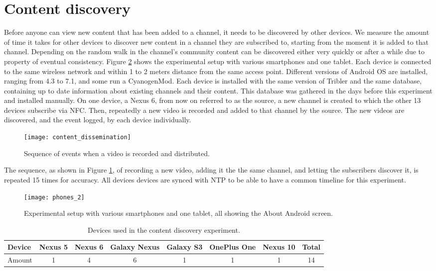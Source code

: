 \section{Content discovery}\label{sec:content_discovery}
Before anyone can view new content that has been added to a channel, it needs to be discovered by other devices.
We measure the amount of time it takes for other devices to discover new content in a channel they are subscribed to, starting from the moment it is added to that channel.
Depending on the random walk in the channel's community content can be discovered either very quickly or after a while due to property of eventual consistency.
Figure \ref{fig:phones_2} shows the experimental setup with various smartphones and one tablet.
Each device is connected to the same wireless network and within 1 to 2 meters distance from the same access point.
Different versions of Android OS are installed, ranging from 4.3 to 7.1, and some run a CyanogenMod.
Each device is installed with the same version of Tribler and the same database, containing up to date information about existing channels and their content.
This database was gathered in the days before this experiment and installed manually.
On one device, a Nexus 6, from now on referred to as the source, a new channel is created to which the other 13 devices subscribe via NFC.
Then, repeatedly a new video is recorded and added to that channel by the source.
The new videos are discovered, and the event logged, by each device individually.
\begin{figure}[H]
	\centering
	\texttt{[image: content\_dissemination]}
	\caption{Sequence of events when a video is recorded and distributed.}
	\label{fig:content_dissemination}
\end{figure}
The sequence, as shown in Figure \ref{fig:content_dissemination}, of recording a new video, adding it the the same channel, and letting the subscribers discover it, is repeated 15 times for accuracy.
All devices devices are synced with NTP to be able to have a common timeline for this experiment.
\begin{figure}[H]
	\centering
	\texttt{[image: phones\_2]}
	\caption{Experimental setup with various smartphones and one tablet, all showing the About Android screen.}
	\label{fig:phones_2}
\end{figure}
\begin{table}[H]
	\begin{tabular}{l | *{6}{c} || c} \hline
		Device & Nexus 5 & Nexus 6 & Galaxy Nexus & Galaxy S3 & OnePlus One & Nexus 10 & Total \\ \hline
		Amount & 1 & 4 & 6 & 1 & 1 & 1 & 14 \\ \hline
	\end{tabular}
	\caption{Devices used in the content discovery experiment.}
	\label{table:devices}
\end{table}
